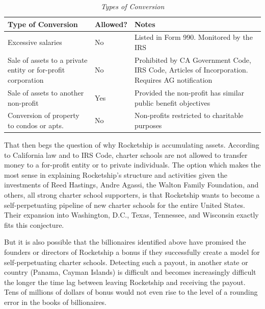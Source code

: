 \noindent%
\begin{table}[ht]
  \caption[Types of Conversion]{\textit{Types of Conversion}}%
  \label{tab:types_conversion}
  \begin{tabulary}{\textwidth}{LLL}
    \toprule
    \textbf{Type of Conversion} & \mbox{\textbf{Allowed?}} & \textbf{Notes} \\
    \midrule
    Excessive salaries & No & Listed in Form 990. Monitored by the IRS \vspace{6pt} \\
    Sale of assets to a private entity or for-profit corporation & No & Prohibited by CA Government Code, IRS Code, Articles of Incorporation. Requires AG notification \vspace{6pt} \\
    Sale of assets to another non-profit & Yes & Provided the non-profit has similar public benefit objectives \vspace{6pt} \\
    Conversion of property to condos or apts. & No & Non-profits restricted to charitable purposes \\
    \bottomrule
  \end{tabulary}
\end{table}

That then begs the question of why Rocketship is accumulating assets. According to California law and to IRS Code, charter schools are not allowed to transfer money to a for-profit entity or to private individuals. The option which makes the most sense in explaining Rocketship's structure and activities given the investments of Reed Hastings, Andre Agassi, the Walton Family Foundation, and others, all strong charter school supporters, is that Rocketship wants to become a self-perpetuating pipeline of new charter schools for the entire United States. Their expansion into Washington, D.C., Texas, Tennessee, and Wisconsin exactly fits this conjecture.

But it is also possible that the billionaires identified above have promised the founders or directors of Rocketship a bonus if they successfully create a model for self-perpetuating charter schools. Detecting such a payout, in another state or country (Panama, Cayman Islands) is difficult and becomes increasingly difficult the longer the time lag between leaving Rocketship and receiving the payout. Tens of millions of dollars of bonus would not even rise to the level of a rounding error in the books of billionaires.

